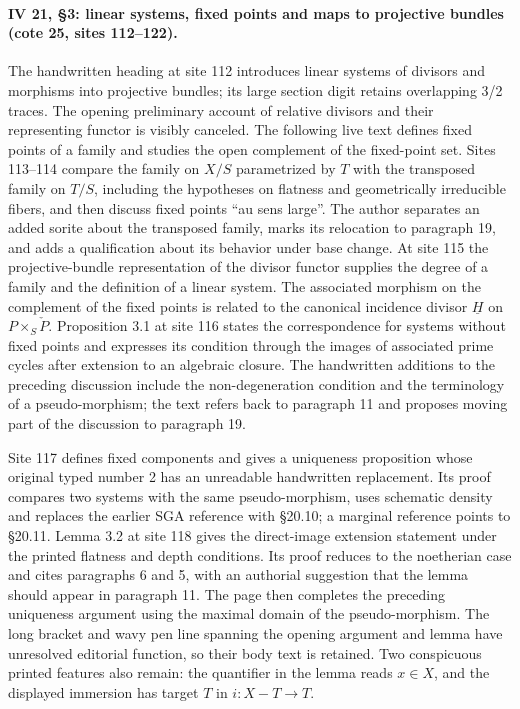 \paragraph{IV 21, \S 3: linear systems, fixed points and maps to projective bundles (cote 25, sites 112--122).}
The handwritten heading at site 112 introduces linear systems of divisors and morphisms into projective bundles; its large section digit retains overlapping 3/2 traces. The opening preliminary account of relative divisors and their representing functor is visibly canceled. The following live text defines fixed points of a family and studies the open complement of the fixed-point set. Sites 113--114 compare the family on $X/S$ parametrized by $T$ with the transposed family on $T/S$, including the hypotheses on flatness and geometrically irreducible fibers, and then discuss fixed points ``au sens large''. The author separates an added sorite about the transposed family, marks its relocation to paragraph 19, and adds a qualification about its behavior under base change. At site 115 the projective-bundle representation of the divisor functor supplies the degree of a family and the definition of a linear system. The associated morphism on the complement of the fixed points is related to the canonical incidence divisor $\underline H$ on $P\times_S\check P$. Proposition 3.1 at site 116 states the correspondence for systems without fixed points and expresses its condition through the images of associated prime cycles after extension to an algebraic closure. The handwritten additions to the preceding discussion include the non-degeneration condition and the terminology of a pseudo-morphism; the text refers back to paragraph 11 and proposes moving part of the discussion to paragraph 19.

Site 117 defines fixed components and gives a uniqueness proposition whose original typed number 2 has an unreadable handwritten replacement. Its proof compares two systems with the same pseudo-morphism, uses schematic density and replaces the earlier SGA reference with \S 20.10; a marginal reference points to \S 20.11. Lemma 3.2 at site 118 gives the direct-image extension statement under the printed flatness and depth conditions. Its proof reduces to the noetherian case and cites paragraphs 6 and 5, with an authorial suggestion that the lemma should appear in paragraph 11. The page then completes the preceding uniqueness argument using the maximal domain of the pseudo-morphism. The long bracket and wavy pen line spanning the opening argument and lemma have unresolved editorial function, so their body text is retained. Two conspicuous printed features also remain: the quantifier in the lemma reads $x\in X$, and the displayed immersion has target $T$ in $i:X-T\to T$.

